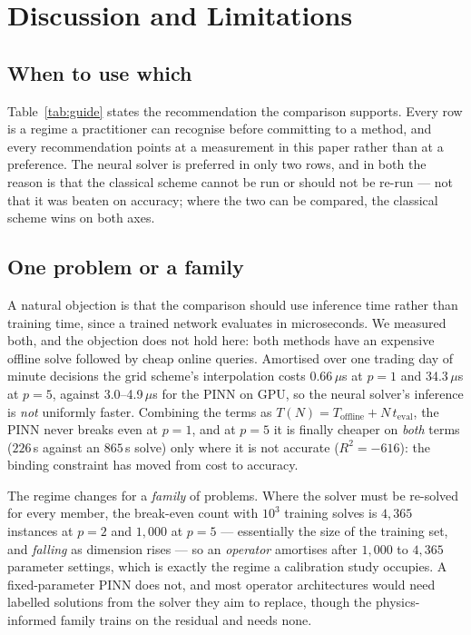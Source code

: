 \documentclass[conference]{IEEEtran}
\begin{document}
\section{Discussion and Limitations}\label{sec:disc}

\subsection{When to use which}
Table~\ref{tab:guide} states the recommendation the comparison supports. Every row is a regime a
practitioner can recognise before committing to a method, and every recommendation points at a
measurement in this paper rather than at a preference. The neural solver is preferred in only two
rows, and in both the reason is that the classical scheme cannot be run or should not be re-run ---
not that it was beaten on accuracy; where the two can be compared, the classical scheme wins on both
axes.



\subsection{One problem or a family}
A natural objection is that the comparison should use inference time rather than training time, since
a trained network evaluates in microseconds. We measured both, and the objection does not hold here:
both methods have an expensive offline solve followed by cheap online queries. Amortised over one
trading day of minute decisions the grid scheme's interpolation costs 0.66\,$\mu$s at $p=1$ and
34.3\,$\mu$s at $p=5$, against 3.0--4.9\,$\mu$s for the PINN on GPU, so the neural solver's
inference is \emph{not} uniformly faster. Combining the terms as
$T(N) = T_{\text{offline}} + N\,t_{\text{eval}}$, the PINN never breaks even at $p=1$, and at $p=5$
it is finally cheaper on \emph{both} terms ($226$\,s against an $865$\,s solve) only where it is not
accurate ($R^2 = -616$): the binding constraint has moved from cost to accuracy.

The regime changes for a \emph{family} of problems. Where the solver must be re-solved for every
member, the break-even count with $10^3$ training solves is $4{,}365$ instances at $p=2$ and
$1{,}000$ at $p=5$ --- essentially the size of the training set, and \emph{falling} as dimension
rises --- so an \emph{operator} amortises after $1{,}000$ to $4{,}365$ parameter settings, which is
exactly the regime a calibration study occupies. A fixed-parameter PINN does not, and most operator
architectures would need labelled solutions from the solver they aim to replace, though the
physics-informed family \cite{wang2021physics} trains on the residual and needs none.
\end{document}
